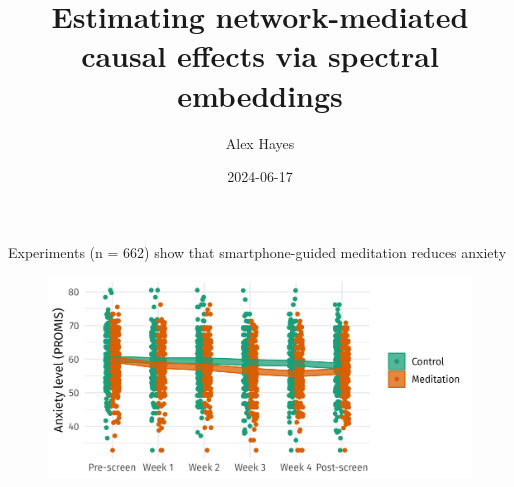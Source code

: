 \documentclass[aspectratio=169]{beamer}
\title{Estimating network-mediated causal effects via spectral embeddings}
\date{2024-06-17}
\author{Alex Hayes}
\institute{University of Wisconsin-Madison}
\theoremstyle{remark}
\begin{document}
\maketitle

{
    \begin{frame}
    \end{frame}
}

\begin{frame}{Experiments (n = 662) show that smartphone-guided meditation reduces anxiety}
    \begin{figure}
        \centering
        \includegraphics{./figures/ate.png}
    \end{figure}
\end{frame}
\end{document}

